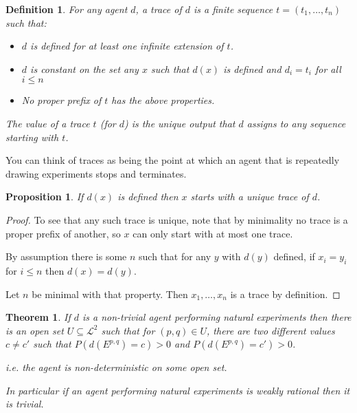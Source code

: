 \documentclass[a4paper]{book}
\newtheorem{definition}{Definition}
\newtheorem{proposition}{Proposition}
\newtheorem{theorem}{Theorem}
\begin{document}
\begin{definition}
For any agent $d$, a trace of $d$ is a finite sequence $t = (t_1, \ldots, t_n)$
such that:

\begin{itemize}
\item $d$ is defined for at least one infinite extension of $t$.
\item $d$ is constant on the set any $x$ such that $d(x)$ is defined
and $d_i = t_i$ for all $i \leq n$
\item No proper prefix of $t$ has the above properties.
\end{itemize}

The value of a trace $t$ (for $d$) is the unique output that $d$ assigns to any
sequence starting with $t$.
\end{definition}

You can think of traces as being the point at which an agent that is repeatedly
drawing experiments stops and terminates.

\begin{proposition}
If $d(x)$
is defined then $x$
starts with a unique trace of $d$.
\end{proposition}

\begin{proof}
To see that any such trace is unique, note that by minimality no
trace is a proper prefix of another, so $x$
can only start with at most one trace.

By assumption there is some $n$
such that for any $y$
with $d(y)$
defined, if $x_i = y_i$
for $i \leq n$
then $d(x) = d(y)$.

Let $n$
be minimal with that property. Then $x_1, \ldots, x_n$
is a trace by definition.
\end{proof}

\begin{theorem}
If $d$ is a non-trivial agent performing natural experiments
then there is an open set $U \subseteq \mathcal{L}^2$
such that for $(p, q) \in U$,
there are two different values $c \neq c'$
such that $P(d(E^{p, q}) = c) > 0$
and $P(d(E^{p, q}) = c') > 0$.

i.e. the agent is non-deterministic on some open set.

In particular if an agent performing natural experiments is
weakly rational then it is trivial.
\end{theorem}
\end{document}
